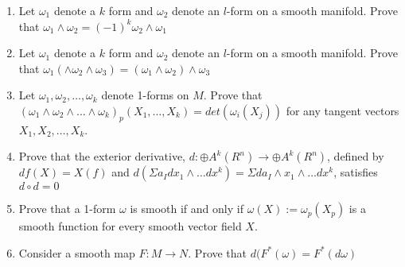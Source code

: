 \begin{enumerate}
\item Let $\omega_1$ denote a $k$ form and $\omega_2$ denote an $l$-form on a smooth manifold. Prove that $\omega_1 \wedge \omega_2 = (-1)^k\omega_2 \wedge \omega_1$
  \item Let $\omega_1$ denote a $k$ form and $\omega_2$ denote an $l$-form on a smooth manifold. Prove that $\omega_1 (\wedge \omega_2 \wedge \omega_3) = (\omega_1 \wedge \omega_2) \wedge \omega_3$ 
  \item Let $\omega_1, \omega_2, \ldots, \omega_k$ denote 1-forms on $M$. Prove that $(\omega_1 \wedge \omega_2 \wedge \ldots \wedge \omega_k)_p(X_1, \ldots, X_k)= det(\omega_i(X_j))$ for any tangent vectors $X_1, X_2,
    \ldots, X_k$.
    \item Prove that the exterior derivative, $d : \oplus A^k(R^n) \to \oplus A^k(R^n)$, defined by $df(X) = X(f)$ and $d(\Sigma a_I dx_1 \wedge \ldots dx^k) = \Sigma da_I \wedge x_1 \wedge \ldots dx^k$, satisfies $d\circ d = 0$
    \item Prove that a 1-form $\omega$ is smooth if and only if $\omega(X):= \omega_p(X_p)$ is a smooth function for every smooth vector field $X$.
      \item Consider a smooth map $F : M \to N$. Prove that $d(F^*(\omega) = F^*(d\omega)$
\end{enumerate}
